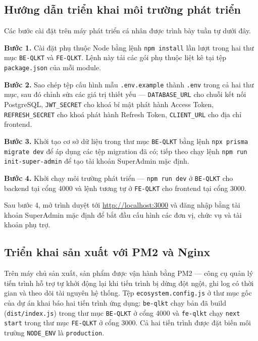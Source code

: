 \documentclass[../DoAn.tex]{subfiles}
\begin{document}
\subsection{Hướng dẫn triển khai môi trường phát triển}
\label{subsection:4.5.2}

Các bước cài đặt trên máy phát triển cá nhân được trình bày tuần tự dưới đây.

\textbf{Bước 1.} Cài đặt phụ thuộc Node bằng lệnh \texttt{npm install} lần lượt trong hai thư mục \texttt{BE-QLKT} và \texttt{FE-QLKT}. Lệnh này tải các gói phụ thuộc liệt kê tại tệp \texttt{package.json} của mỗi module.

\textbf{Bước 2.} Sao chép tệp cấu hình mẫu \texttt{.env.example} thành \texttt{.env} trong cả hai thư mục, sau đó chỉnh sửa các giá trị thiết yếu --- \texttt{DATABASE\_URL} cho chuỗi kết nối PostgreSQL, \texttt{JWT\_SECRET} cho khoá bí mật phát hành Access Token, \texttt{REFRESH\_SECRET} cho khoá phát hành Refresh Token, \texttt{CLIENT\_URL} cho địa chỉ frontend.

\textbf{Bước 3.} Khởi tạo cơ sở dữ liệu trong thư mục \texttt{BE-QLKT} bằng lệnh \texttt{npx prisma migrate dev} để áp dụng các tệp migration đã có; tiếp theo chạy lệnh \texttt{npm run init-super-admin} để tạo tài khoản SuperAdmin mặc định.

\textbf{Bước 4.} Khởi chạy môi trường phát triển --- \texttt{npm run dev} ở \texttt{BE-QLKT} cho backend tại cổng 4000 và lệnh tương tự ở \texttt{FE-QLKT} cho frontend tại cổng 3000.

Sau bước 4, mở trình duyệt tới \url{http://localhost:3000} và đăng nhập bằng tài khoản SuperAdmin mặc định để bắt đầu cấu hình các đơn vị, chức vụ và tài khoản phụ trợ.

\subsection{Triển khai sản xuất với PM2 và Nginx}
\label{subsection:4.5.3}

Trên máy chủ sản xuất, sản phẩm được vận hành bằng PM2 --- công cụ quản lý tiến trình hỗ trợ tự khởi động lại khi tiến trình bị dừng đột ngột, ghi log có thời gian và theo dõi tài nguyên hệ thống. Tệp \texttt{ecosystem.config.js} ở thư mục gốc của dự án khai báo hai tiến trình ứng dụng: \texttt{be-qlkt} chạy bản đã build (\texttt{dist/index.js}) trong thư mục \texttt{BE-QLKT} ở cổng 4000 và \texttt{fe-qlkt} chạy \texttt{next start} trong thư mục \texttt{FE-QLKT} ở cổng 3000. Cả hai tiến trình được đặt biến môi trường \texttt{NODE\_ENV} là \texttt{production}.
\end{document}
